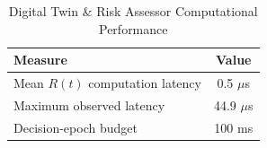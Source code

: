 \begin{table}[t]
\caption{Digital Twin \& Risk Assessor Computational Performance}
\label{tab:xv}
\centering
\begin{tabular}{lc}
\toprule
Measure & Value \\
\midrule
Mean $R(t)$ computation latency & 0.5 $\mu$s \\
Maximum observed latency & 44.9 $\mu$s \\
Decision-epoch budget & 100 ms \\
\bottomrule
\end{tabular}
\end{table}
